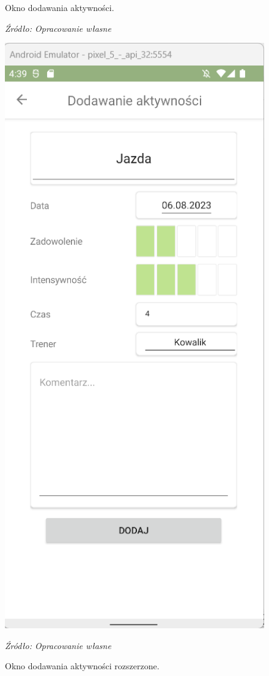 \documentclass[12pt,oneside]{report}
\begin{document}
\begin{figure}[H]
\begin{center}
\begin{minipage}{5cm}
	\caption{\centering Okno dodawania aktywności.}
	\textit{Źródło: Opracowanie własne}
	\label{AddActivitySimple}
\end{minipage}
\hfil
\begin{minipage}{5cm}
	\centering
	\includegraphics[scale=0.6]{AddActivityAdvancedView}
	\caption{Okno dodawania aktywności rozszerzone.}
	\textit{Źródło: Opracowanie własne}
	\label{AddActivityAdvanced}
\end{minipage}
	\end{center}
\end{figure}
\end{document}
